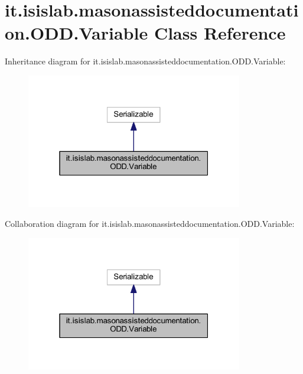 \hypertarget{classit_1_1isislab_1_1masonassisteddocumentation_1_1_o_d_d_1_1_variable}{\section{it.\-isislab.\-masonassisteddocumentation.\-O\-D\-D.\-Variable Class Reference}
\label{classit_1_1isislab_1_1masonassisteddocumentation_1_1_o_d_d_1_1_variable}
}


Inheritance diagram for it.\-isislab.\-masonassisteddocumentation.\-O\-D\-D.\-Variable\-:
\nopagebreak
\begin{figure}[H]
\begin{center}
\leavevmode
\includegraphics[width=268pt]{classit_1_1isislab_1_1masonassisteddocumentation_1_1_o_d_d_1_1_variable__inherit__graph}
\end{center}
\end{figure}


Collaboration diagram for it.\-isislab.\-masonassisteddocumentation.\-O\-D\-D.\-Variable\-:
\nopagebreak
\begin{figure}[H]
\begin{center}
\leavevmode
\includegraphics[width=268pt]{classit_1_1isislab_1_1masonassisteddocumentation_1_1_o_d_d_1_1_variable__coll__graph}
\end{center}
\end{figure}
